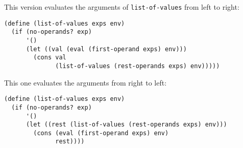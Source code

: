\documentclass[a4paper,12pt]{article}
\begin{document}
This version evaluates the arguments of \lstinline!list-of-values!
from left to right:
\begin{lstlisting}
(define (list-of-values exps env)
  (if (no-operands? exp)
      '()
      (let ((val (eval (first-operand exps) env)))
        (cons val
              (list-of-values (rest-operands exps) env)))))
\end{lstlisting}
This one evaluates the arguments from right to left:
\begin{lstlisting}
(define (list-of-values exps env)
  (if (no-operands? exp)
      '()
      (let ((rest (list-of-values (rest-operands exps) env)))
        (cons (eval (first-operand exps) env)
              rest))))
\end{lstlisting}
\end{document}
